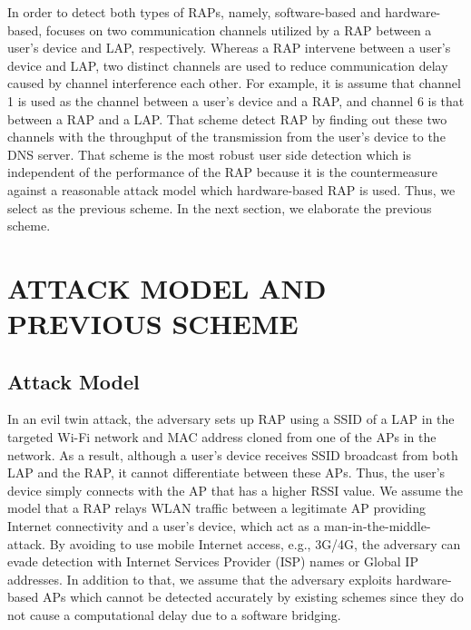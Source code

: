 \documentclass[conference]{IEEEtran}
\begin{document}
In order to detect both types of RAPs, namely, software-based and hardware-based, \cite{previous} focuses on two communication channels utilized by a RAP between a user's device and LAP, respectively.
Whereas a RAP intervene between a user's device and LAP, two distinct channels are used to reduce communication delay caused by channel interference each other.
For example, it is assume that channel 1 is used as the channel between a user's device and a RAP, and channel 6 is that between a RAP and a LAP.
That scheme detect RAP by finding out these two channels with the throughput of the transmission from the user's device to the DNS server.
That scheme is the most robust user side detection which is independent of the performance of the RAP because it is the countermeasure against a reasonable attack model which hardware-based RAP is used.
Thus, we select \cite{previous} as the previous scheme.
In the next section, we elaborate the previous scheme.



\section{ATTACK MODEL AND PREVIOUS SCHEME}
\subsection{Attack Model}
In an evil twin attack, the adversary sets up RAP using a SSID of a LAP in the targeted Wi-Fi network and MAC address cloned from one of the APs in the network.
As a result, although a user's device receives SSID broadcast from both LAP and the RAP, it cannot differentiate between these APs.
Thus, the user's device simply connects with the AP that has a higher RSSI value.
We assume the model that a RAP relays WLAN traffic between a legitimate AP providing Internet connectivity and a user's device, which act as a man-in-the-middle-attack.
By avoiding to use mobile Internet access, e.g., 3G/4G, the adversary can evade detection with Internet Services Provider (ISP) names or Global IP addresses\cite{rtt}.
In addition to that, we assume that the adversary exploits hardware-based APs which cannot be detected accurately by existing schemes since they do not cause a computational delay due to a software bridging.
\end{document}
